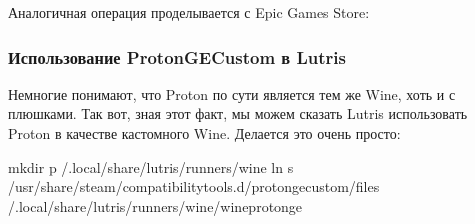 \documentclass[letterpaper,10pt,russian,openany]{sphinxmanual}
\begin{document}
\sphinxAtStartPar
{}

\noindent{}

\sphinxAtStartPar
{}

\noindent{}

\sphinxAtStartPar
Аналогичная операция проделывается с Epic Games Store:

\sphinxAtStartPar
{}

\noindent{}

\sphinxAtStartPar
{}

\noindent{}

\sphinxAtStartPar
{}

\noindent{}

\sphinxAtStartPar
{}

\sphinxAtStartPar
{}

\ignorespaces 

\subsubsection{Использование Proton\sphinxhyphen{}GE\sphinxhyphen{}Custom в Lutris}
\label{\detokenize{source/linux-gaming:proton-ge-custom-lutris}}\label{\detokenize{source/linux-gaming:proton-ge-with-lutris}}\label{\detokenize{source/linux-gaming:index-15}}
\sphinxAtStartPar
Немногие понимают, что Proton по сути является тем же Wine, хоть и с плюшками.
Так вот, зная этот факт, мы можем сказать Lutris использовать Proton в качестве кастомного Wine.
Делается это очень просто:

\begin{sphinxVerbatim}[commandchars=\\\{\}]
mkdir \PYGZhy{}p \PYGZti{}/.local/share/lutris/runners/wine
ln \PYGZhy{}s /usr/share/steam/compatibilitytools.d/proton\PYGZhy{}ge\PYGZhy{}custom/files \PYGZti{}/.local/share/lutris/runners/wine/wine\PYGZhy{}proton\PYGZhy{}ge
\end{sphinxVerbatim}
\end{document}
